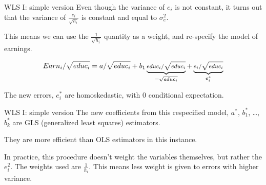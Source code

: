\documentclass[12pt,english,pdf,xcolor=dvipsnames,aspectratio=169,handout]{beamer}\usepackage[]{graphicx}\usepackage[]{xcolor}
\begin{document}
\begin{frame}{WLS I: simple version}
 Even though the variance of $e_i$ is not constant, it turns out that the variance of $\frac{e_i}{\sqrt{h_i}}$ is constant and equal to $\sigma_e^2$.\bigskip

   This means we can use the $\frac{1}{\sqrt{h_i}}$ quantity as a weight, and re-specify the model of earnings.

   \begin{equation}
     \footnotesize
     Earn_i/\sqrt{educ_i} = a/\sqrt{educ_i} + b_1\underbrace{educ_i/\sqrt{educ_i}}_{=\sqrt{educ_i}} + \underbrace{e_i/\sqrt{educ_i}}_{e_i^*}
   \end{equation}

   The new errors, $e_i^*$ are homoskedastic, with 0 conditional expectation.
 \end{frame}


 \begin{frame}{WLS I: simple version}
   The new coefficients from this respecified model, $a^*$, $b_1^*$, \dots, $b_k^*$ are GLS (generalized least squares) estimators.\bigskip

   They are more efficient than OLS estimators in this instance.\bigskip

   In practice, this procedure doesn't weight the variables themselves, but rather the $e_i^2$. The weights used are $\frac{1}{h_i}$. This means less weight is given to errors with higher variance.
 \end{frame}
\end{document}
